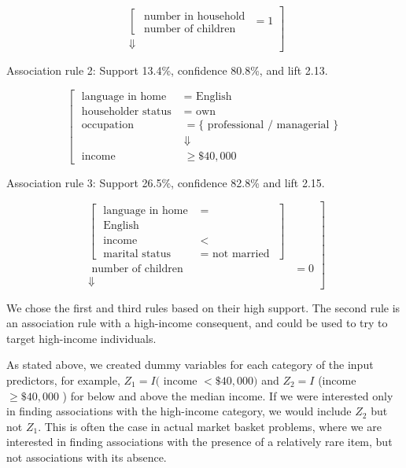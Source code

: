 \documentclass[10pt]{article}
\begin{document}
$$
\left.\begin{array}{c}
{\left[\begin{array}{c}
\text { number in household } \\
\text { number of children }
\end{array}=1\right.} \\
\Downarrow
\end{array}\right]
$$

Association rule 2: Support 13.4\%, confidence 80.8\%, and lift 2.13.

$$
\left[\begin{array}{rl}
\text { language in home } & =\text { English } \\
\text { householder status } & =\text { own } \\
\text { occupation } & =\{\text { professional } / \text { managerial }\} \\
& \Downarrow \\
\text { income } & \geq \$ 40,000
\end{array}\right.
$$

Association rule 3: Support 26.5\%, confidence 82.8\% and lift 2.15.

$$
\left.\begin{array}{rl}
{\left[\begin{array}{rl}
\text { language in home } & = \\
\text { English } \\
\text { income } & < \\
\text { marital status } & =\text { not married }
\end{array}\right]} \\
\text { number of children } & =0 \\
\Downarrow &
\end{array}\right]
$$

We chose the first and third rules based on their high support. The second rule is an association rule with a high-income consequent, and could be used to try to target high-income individuals.

As stated above, we created dummy variables for each category of the input predictors, for example, $Z_{1}=I($ income $<\$ 40,000)$ and $Z_{2}= I$ (income $\geq \$ 40,000$ ) for below and above the median income. If we were interested only in finding associations with the high-income category, we would include $Z_{2}$ but not $Z_{1}$. This is often the case in actual market basket problems, where we are interested in finding associations with the presence of a relatively rare item, but not associations with its absence.
\end{document}
